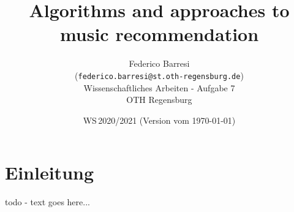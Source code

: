\documentclass[11pt,twoside,a4paper]{article}
\begin{document}
\title{Algorithms and approaches to music recommendation}
\author{Federico Barresi \\
  (\texttt{federico.barresi@st.oth-regensburg.de})\\[5mm]
  Wissenschaftliches Arbeiten - Aufgabe 7\\
  OTH Regensburg
}
  
\date{WS\,2020/2021 (Version vom \today)}

\maketitle


\section{Einleitung}
todo - text goes here...\cite{Shan2009}



\end{document}
